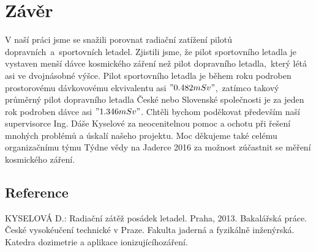 \documentclass[10pt,a4paper]{article}
\begin{document}
\section*{Závěr}
V naší práci jsme se snažili porovnat radiační zatížení pilotů
dopravních~a~sportovních letadel. Zjistili jsme, že pilot sportovního letadla je
vystaven menší dávce kosmického záření než pilot dopravního letadla,~který létá
asi ve dvojnásobné výšce. Pilot sportovního letadla je během roku podroben
prostorovému dávkovovému ekvivalentu asi $"0.482 mSv" $,~zatímco takový průměrný
pilot dopravního letadla České nebo Slovenské společnosti je za jeden rok
podroben dávce asi $"1.346 mSv"$.
Chtěli bychom poděkovat především naší supervisorce Ing. Dáše Kyselové za
neocenitelnou pomoc a ochotu při řešení mnohých problémů a úskalí našeho
projektu. Moc děkujeme také celému organizačnímu týmu Týdne vědy na Jaderce
2016 za možnost zúčastnit se měření kosmického záření.
\subsection*{Reference}
\begin{thebibliography}{99}
KYSELOVÁ D.: Radiační zátěž posádek letadel. Praha, 2013. Bakalářská práce. České vysokéučení technické v Praze. Fakulta jaderná a fyzikálně inženýrská. Katedra dozimetrie a aplikace ionizujícíhozáření.
\end{thebibliography}
\end{document}
